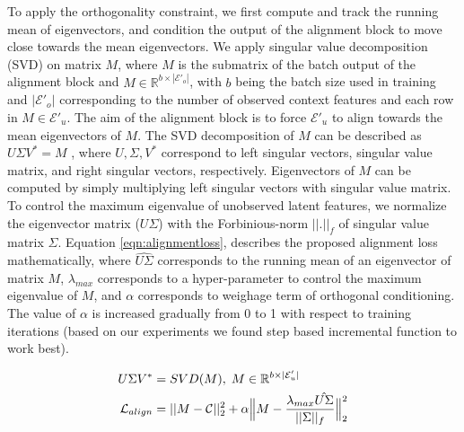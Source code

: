 \documentclass{article}
\newcommand{\ftcom}[2][]{\todo[author=FT, #1]{#2}}
\begin{document}
To apply the orthogonality constraint, we first compute and track the running mean of eigenvectors, and condition the output of the alignment block to move close towards the mean eigenvectors.
We apply singular value decomposition (SVD) on matrix $M$, where $M$ is the submatrix of the batch output of the alignment block and $M \in \mathbb{R}^{b \times |\mathcal{E}'_o|}$, with $b$ being the  batch size used in training and $|\mathcal{E}'_o|$ corresponding to the number of observed context features and each row in $M \in \mathcal{E}'_u$. 
The aim of the alignment block is to force $\mathcal{E}'_u$ to align towards the mean eigenvectors of $M$. 
The SVD decomposition of $M$ can be described as $U\Sigma V^* = M$
, where $U, \Sigma, V^*$ correspond to left singular vectors, singular value matrix, and right singular vectors, respectively.
Eigenvectors of $M$ can be computed by simply multiplying left singular vectors with singular value matrix.
To control the maximum eigenvalue of unobserved latent features,  we normalize the eigenvector matrix ($U\Sigma$) with the Forbinious-norm $||.||_f$ of singular value matrix $\Sigma$.
Equation \ref{eqn:alignmentloss}, describes the proposed alignment loss mathematically, where $\hat{U\Sigma}$ corresponds to the running mean of an eigenvector of matrix $M$, $\lambda_{max}$ corresponds to a hyper-parameter to control the maximum eigenvalue of $M$, and $\alpha$ corresponds to weighage term of orthogonal conditioning.
The value of $\alpha$ is increased gradually from 0 to 1 with respect to training iterations (based on our experiments we found step based incremental function to work best). 

\begin{align}
    \begin{split}
      U \Sigma V^* &=  SVD(M), \; M \in \mathbb{R}^{b \times |\mathcal{E}'_u|}\\
    \mathcal{L}_{align} &= ||M - \mathcal{C}||^2_2 + \alpha \Big{\|}M - \frac{\lambda_{max} \hat{U\Sigma}}{||\Sigma||_f} \Big{\|}^2_2
    \end{split}
    \label{eqn:alignmentloss}
\end{align}
\end{document}
